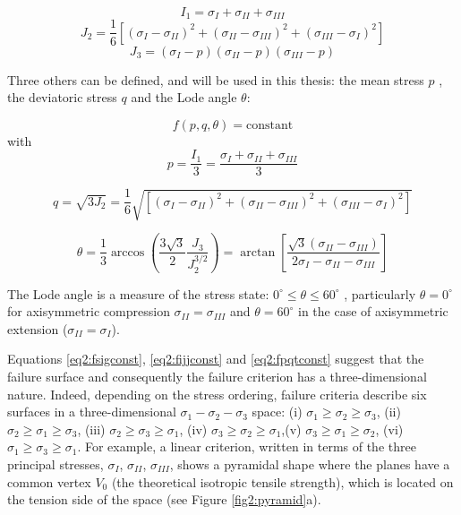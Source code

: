\begin{equation}
   I_1 = \sigma_{I} + \sigma_{II} + \sigma_{III}
\end{equation}
\begin{equation}
    J_{2} = \frac{1}{6}\left[\left(\sigma_{I}-\sigma_{I I}\right)^{2}+\left(\sigma_{I I}-\sigma_{I I I}\right)^{2}+\left(\sigma_{I I I}-\sigma_{I}\right)^{2}\right]
\end{equation}
\begin{equation}
    J_{3} = \left(\sigma_{I}-p\right)\left(\sigma_{I I}-p\right)\left(\sigma_{III}-p\right)
\end{equation}

Three others can be defined, and will be used in this thesis: the mean stress $p$ , the deviatoric stress $q$ and the Lode angle $\theta$:

\begin{equation} \label{eq2:fpqtconst}
    f(p,q,\theta) = \text{constant}
\end{equation}
with
\begin{equation} \label{eq2:peq}
    p=\frac{I_{1}}{3}=\frac{\sigma_{I}+\sigma_{II}+\sigma_{III}}{3}
\end{equation}

\begin{equation}\label{eq2:qeq}
    q=\sqrt{3 J_{2}}=\frac{1}{6} \sqrt{\left[\left(\sigma_{I}-\sigma_{II}\right)^{2}+\left(\sigma_{II}-\sigma_{III}\right)^{2}+\left(\sigma_{III}-\sigma_{I}\right)^{2}\right]}
\end{equation}

\begin{equation}\label{eq2:theta}
    \theta=\frac{1}{3} \arccos \left(\frac{3 \sqrt{3}}{2} \frac{J_{3}}{J_{2}^{3 / 2}}\right)=\arctan \left[\frac{\sqrt{3}\left(\sigma_{II}-\sigma_{III}\right)}{2 \sigma_{I}-\sigma_{II}-\sigma_{III}}\right]
\end{equation}

The Lode angle is a measure of the stress state: $0^{\circ} \leq \theta \leq 60^{\circ}$ , particularly $\theta = 0^{\circ}$  for axisymmetric compression $\sigma_{II} = \sigma_{III} $ and $\theta = 60^{\circ}$ in the case of axisymmetric extension ($\sigma_{II} = \sigma_{I} $). 

Equations \ref{eq2:fsigconst}, \ref{eq2:fijjconst} and \ref{eq2:fpqtconst} suggest that the failure surface and consequently the failure criterion has a three-dimensional nature. Indeed, depending on the stress ordering, failure criteria describe six surfaces in a three-dimensional  $\sigma_1 -\sigma_2 -\sigma_3$  space: (i) $\sigma_1 \geq \sigma_2 \geq \sigma_3$, (ii) $\sigma_2 \geq \sigma_1 \geq \sigma_3$, (iii) $\sigma_2 \geq \sigma_3 \geq \sigma_1$, (iv) $\sigma_3 \geq \sigma_2 \geq \sigma_1$,(v) $\sigma_3 \geq \sigma_1 \geq \sigma_2$, (vi) $\sigma_1 \geq \sigma_3 \geq \sigma_1$. For example, a linear criterion, written in terms of the three principal stresses, $\sigma_I$, $\sigma_{II}$, $\sigma_{III}$, shows a pyramidal shape where the planes have a common vertex $V_0$ (the theoretical isotropic tensile strength), which is located on the tension side of the space (see Figure \ref{fig2:pyramid}a).  

